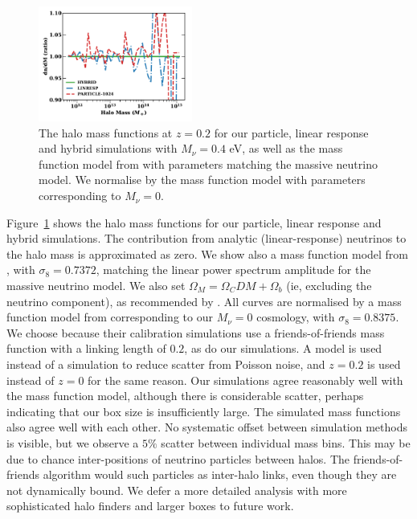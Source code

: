 \documentclass[useAMS, usenatbib]{mnras}
\begin{document}
\begin{figure}
  \includegraphics[width=0.45\textwidth]{nuplots/hmf-0_8333.pdf}
\caption{The halo mass functions at $z=0.2$ for our particle, linear response and hybrid simulations with $M_\nu = 0.4$ eV, as well as the mass function model from \protect\cite{Watson_2013} with parameters matching the massive neutrino model. We normalise by the mass function model with parameters corresponding to $M_\nu = 0$.}
  \label{fig:halomass}
\end{figure}

Figure~\ref{fig:halomass} shows the halo mass functions for our particle, linear response and hybrid simulations. The contribution from analytic (linear-response) neutrinos to the halo mass is approximated as zero. We show also a mass function model from \cite{Watson_2013}, with $\sigma_8 = 0.7372$, matching the linear power spectrum amplitude for the massive neutrino model. We also set $\Omega_M = \Omega_CDM + \Omega_b$ (ie, excluding the neutrino component), as recommended by \cite{FVN_2014}. All curves are normalised by a mass function model from \cite{Watson_2013} corresponding to our $M_\nu = 0$ cosmology, with $\sigma_8 = 0.8375$. We choose \cite{Watson_2013} because their calibration simulations use a friends-of-friends mass function with a linking length of $0.2$, as do our simulations. A model is used instead of a simulation to reduce scatter from Poisson noise, and $z=0.2$ is used instead of $z=0$ for the same reason. Our simulations agree reasonably well with the mass function model, although there is considerable scatter, perhaps indicating that our box size is insufficiently large. The simulated mass functions also agree well with each other. No systematic offset between simulation methods is visible, but we observe a $5\%$ scatter between individual mass bins. This may be due to chance inter-positions of neutrino particles between halos. The friends-of-friends algorithm would such particles as inter-halo links, even though they are not dynamically bound. We defer a more detailed analysis with more sophisticated halo finders and larger boxes to future work.
\end{document}

